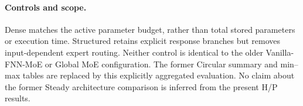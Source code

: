 \documentclass{article}
\providecommand{\DIFaddtex}[1]{{\protect\color{blue} \sf #1}} %
\providecommand{\DIFaddbegin}{} %
\providecommand{\DIFaddend}{} %
\providecommand{\DIFdelbegin}{} %
\providecommand{\DIFdelend}{} %
\providecommand{\DIFadd}[1]{\texorpdfstring{\DIFaddtex{#1}}{#1}} %
\begin{document}
\DIFdelbegin %
\DIFdelend \DIFaddbegin \paragraph{\DIFadd{Controls and scope.}}
\DIFadd{Dense matches the active parameter budget, rather than total stored
parameters or execution time. Structured retains explicit response
branches but removes input-dependent expert routing. Neither control
is identical to the older Vanilla-FNN-MoE or Global MoE configuration.
The former Circular summary and min--max tables are replaced by this
explicitly aggregated evaluation. No claim about the former Steady
architecture comparison is inferred from the present H/P results.
}\DIFaddend 
\end{document}
